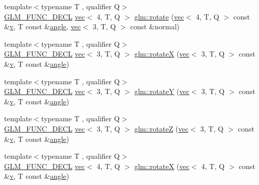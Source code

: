 \begin{DoxyCompactItemize}
\item 
{\footnotesize template$<$typename T , qualifier Q$>$ }\\\hyperlink{setup_8hpp_ab2d052de21a70539923e9bcbf6e83a51}{G\+L\+M\+\_\+\+F\+U\+N\+C\+\_\+\+D\+E\+CL} \hyperlink{structglm_1_1vec}{vec}$<$ 4, T, Q $>$ \hyperlink{group__gtx__rotate__vector_ga1005f1267ed9c57faa3f24cf6873b961}{glm\+::rotate} (\hyperlink{structglm_1_1vec}{vec}$<$ 4, T, Q $>$ const \&\hyperlink{_s_d_l__opengl_8h_a10a82eabcb59d2fcd74acee063775f90}{v}, T const \&\hyperlink{_s_d_l__opengl__glext_8h_a9e06c1f76a20fed54ca742cd25cb02c4}{angle}, \hyperlink{structglm_1_1vec}{vec}$<$ 3, T, Q $>$ const \&normal)
\item 
{\footnotesize template$<$typename T , qualifier Q$>$ }\\\hyperlink{setup_8hpp_ab2d052de21a70539923e9bcbf6e83a51}{G\+L\+M\+\_\+\+F\+U\+N\+C\+\_\+\+D\+E\+CL} \hyperlink{structglm_1_1vec}{vec}$<$ 3, T, Q $>$ \hyperlink{group__gtx__rotate__vector_ga059fdbdba4cca35cdff172a9d0d0afc9}{glm\+::rotateX} (\hyperlink{structglm_1_1vec}{vec}$<$ 3, T, Q $>$ const \&\hyperlink{_s_d_l__opengl_8h_a10a82eabcb59d2fcd74acee063775f90}{v}, T const \&\hyperlink{_s_d_l__opengl__glext_8h_a9e06c1f76a20fed54ca742cd25cb02c4}{angle})
\item 
{\footnotesize template$<$typename T , qualifier Q$>$ }\\\hyperlink{setup_8hpp_ab2d052de21a70539923e9bcbf6e83a51}{G\+L\+M\+\_\+\+F\+U\+N\+C\+\_\+\+D\+E\+CL} \hyperlink{structglm_1_1vec}{vec}$<$ 3, T, Q $>$ \hyperlink{group__gtx__rotate__vector_gaebdc8b054ace27d9f62e054531c6f44d}{glm\+::rotateY} (\hyperlink{structglm_1_1vec}{vec}$<$ 3, T, Q $>$ const \&\hyperlink{_s_d_l__opengl_8h_a10a82eabcb59d2fcd74acee063775f90}{v}, T const \&\hyperlink{_s_d_l__opengl__glext_8h_a9e06c1f76a20fed54ca742cd25cb02c4}{angle})
\item 
{\footnotesize template$<$typename T , qualifier Q$>$ }\\\hyperlink{setup_8hpp_ab2d052de21a70539923e9bcbf6e83a51}{G\+L\+M\+\_\+\+F\+U\+N\+C\+\_\+\+D\+E\+CL} \hyperlink{structglm_1_1vec}{vec}$<$ 3, T, Q $>$ \hyperlink{group__gtx__rotate__vector_ga5a048838a03f6249acbacb4dbacf79c4}{glm\+::rotateZ} (\hyperlink{structglm_1_1vec}{vec}$<$ 3, T, Q $>$ const \&\hyperlink{_s_d_l__opengl_8h_a10a82eabcb59d2fcd74acee063775f90}{v}, T const \&\hyperlink{_s_d_l__opengl__glext_8h_a9e06c1f76a20fed54ca742cd25cb02c4}{angle})
\item 
{\footnotesize template$<$typename T , qualifier Q$>$ }\\\hyperlink{setup_8hpp_ab2d052de21a70539923e9bcbf6e83a51}{G\+L\+M\+\_\+\+F\+U\+N\+C\+\_\+\+D\+E\+CL} \hyperlink{structglm_1_1vec}{vec}$<$ 4, T, Q $>$ \hyperlink{group__gtx__rotate__vector_ga4333b1ea8ebf1bd52bc3801a7617398a}{glm\+::rotateX} (\hyperlink{structglm_1_1vec}{vec}$<$ 4, T, Q $>$ const \&\hyperlink{_s_d_l__opengl_8h_a10a82eabcb59d2fcd74acee063775f90}{v}, T const \&\hyperlink{_s_d_l__opengl__glext_8h_a9e06c1f76a20fed54ca742cd25cb02c4}{angle})

\end{DoxyCompactItemize}
